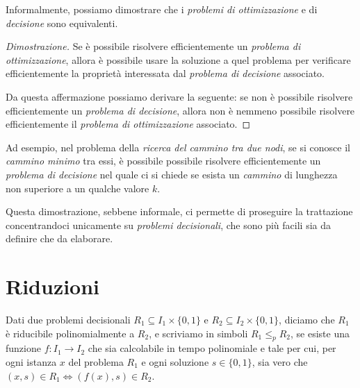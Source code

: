 \noindent
Informalmente, possiamo dimostrare che i \emph{problemi di ottimizzazione} e di
\emph{decisione} sono equivalenti.

\begin{proof}[Dimostrazione]
    Se è possibile risolvere efficientemente un \emph{problema di ottimizzazione},
    allora è possibile usare la soluzione a quel problema per verificare
    efficientemente la proprietà interessata dal \emph{problema di decisione}
    associato.

    Da questa affermazione possiamo derivare la seguente: se non è possibile
    risolvere efficientemente un \emph{problema di decisione}, allora non è
    nemmeno possibile risolvere efficientemente il \emph{problema di
    ottimizzazione} associato.
\end{proof}
\begin{note}
    Ad esempio, nel problema della \emph{ricerca del cammino tra due nodi}, se
    si conosce il \emph{cammino minimo} tra essi, è possibile possibile 
    risolvere efficientemente un \emph{problema di decisione} nel quale ci si
    chiede se esista un \emph{cammino} di lunghezza non superiore a un qualche
    valore $k$.
\end{note}

\noindent
Questa dimostrazione, sebbene informale, ci permette di proseguire la trattazione
concentrandoci unicamente su \emph{problemi decisionali}, che sono più facili sia
da definire che da elaborare.

\section{Riduzioni}
\begin{definition}
    Dati due problemi decisionali $R_1\subseteq I_1\times\{0,1\}$ e
    $R_2\subseteq I_2\times\{0,1\}$, diciamo che $R_1$ è riducibile
    polinomialmente a $R_2$, e scriviamo in simboli $R_1\leq_p R_2$, se esiste
    una funzione $f:I_1\to I_2$ che sia calcolabile in tempo polinomiale e tale
    per cui, per ogni istanza $x$ del problema $R_1$ e ogni soluzione $s\in\{0,1\}$,
    sia vero che $(x,s)\in R_1\Leftrightarrow(f(x), s)\in R_2$.
\end{definition}

